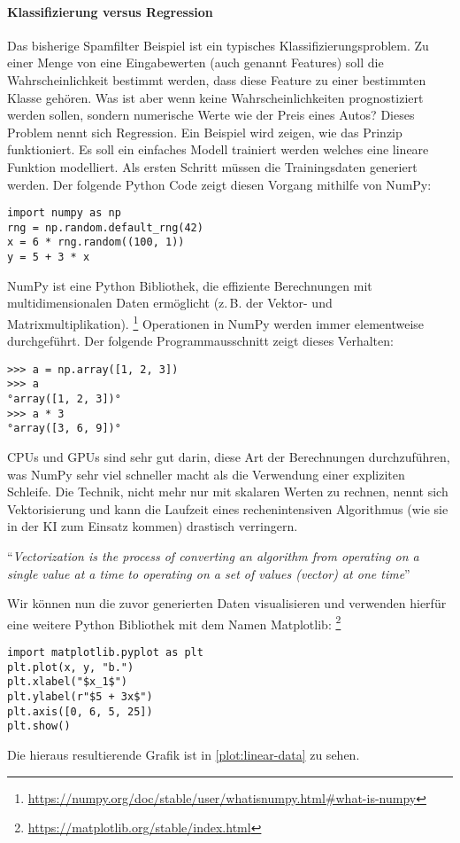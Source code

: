 \paragraph{Klassifizierung versus Regression}
Das bisherige Spamfilter Beispiel ist ein typisches
Klassifizierungsproblem. Zu einer Menge von eine Eingabewerten
(auch genannt Features) soll die Wahrscheinlichkeit bestimmt werden,
dass diese Feature zu einer bestimmten Klasse gehören.
Was ist aber wenn keine Wahrscheinlichkeiten
prognostiziert werden sollen, sondern numerische Werte wie
der Preis eines Autos? Dieses Problem nennt sich Regression.
Ein Beispiel wird zeigen, wie das Prinzip funktioniert.
Es soll ein einfaches Modell trainiert werden welches eine lineare
Funktion modelliert. Als ersten Schritt müssen die Trainingsdaten generiert werden.
Der folgende Python Code zeigt diesen Vorgang mithilfe von NumPy:
\begin{lstlisting}
import numpy as np
rng = np.random.default_rng(42)
x = 6 * rng.random((100, 1))
y = 5 + 3 * x
\end{lstlisting}
NumPy ist eine Python Bibliothek, die effiziente Berechnungen mit
multidimensionalen Daten ermöglicht (z.\,B. der Vektor- und Matrixmultiplikation).
\footnote{\url{https://numpy.org/doc/stable/user/whatisnumpy.html\#what-is-numpy}}
Operationen in NumPy werden immer elementweise durchgeführt. Der folgende Programmausschnitt
zeigt dieses Verhalten:
\begin{lstlisting}
>>> a = np.array([1, 2, 3])
>>> a
°array([1, 2, 3])°
>>> a * 3
°array([3, 6, 9])°
\end{lstlisting}
CPUs und GPUs sind sehr gut darin, diese Art der Berechnungen durchzuführen,
was NumPy sehr viel schneller macht als die Verwendung einer expliziten Schleife.
Die Technik, nicht mehr nur mit skalaren Werten zu rechnen,
nennt sich Vektorisierung und kann
die Laufzeit eines rechenintensiven Algorithmus
(wie sie in der KI zum Einsatz kommen) drastisch verringern.
\begin{aquote}{\parencite{online:vectorization}}
  \enquote{\textit{Vectorization is the process of converting an algorithm
      from operating on a single value at a time to
      operating on a set of values (vector) at one time}}
\end{aquote}
Wir können nun die zuvor generierten Daten visualisieren und verwenden hierfür
eine weitere Python Bibliothek mit dem Namen Matplotlib:
\footnote{\url{https://matplotlib.org/stable/index.html}}
\begin{lstlisting}
import matplotlib.pyplot as plt
plt.plot(x, y, "b.")
plt.xlabel("$x_1$")
plt.ylabel(r"$5 + 3x$")
plt.axis([0, 6, 5, 25])
plt.show()
\end{lstlisting}
Die hieraus resultierende Grafik ist in \autoref{plot:linear-data} zu sehen.

